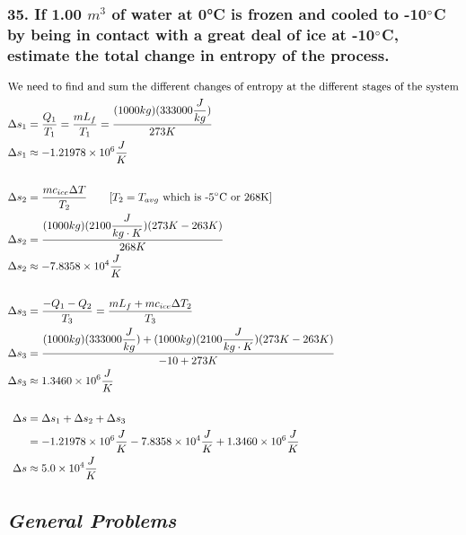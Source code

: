 \documentclass{article}
\begin{document}
\subsubsection*{
    35. If 1.00 $m^3$ of water at 0°C is frozen and cooled to -10$\degree$C 
    by being in contact with a great deal of ice at -10$\degree$C,
    estimate the total change in entropy of the process.
}
\begin{align*}
    \intertext{We need to find and sum the different changes of entropy at the
    different stages of the system}
    \Delta s_1 &= \displaystyle\frac{Q_1}{T_1} = \displaystyle\frac{mL_f}{T_1} =
    \displaystyle\frac{(1000kg)(333000 \displaystyle\frac{J}{kg})}{273K} \\
    \Delta s_1 &\approx -1.21978\times 10^6 \frac{J}{K} \\\\
    \Delta s_2 &= \displaystyle\frac{mc_{ice}\Delta T}{T_2} \qquad [\text{$T_2 =
    T_{avg}$ which is -5$\degree$C or 268K}] \\
    \Delta s_2 &= \displaystyle\frac{(1000kg)(2100
    \displaystyle\frac{J}{kg\cdot K})(273K-263K)}{268K} \\
    \Delta s_2 &\approx -7.8358 \times 10^4 \displaystyle\frac{J}{K}
    \\\\
    \Delta s_3 &= \displaystyle\frac{-Q_1 - Q_2}{T_3} = \displaystyle\frac{mL_f
    + mc_{ice} \Delta T_2}{T_3} \\
    \Delta s_3 &= \displaystyle\frac{(1000kg)(333000
    \displaystyle\frac{J}{kg}) + (1000kg)(2100 \displaystyle\frac{J}{kg\cdot
    K})(273K - 263K)}{-10 + 273K} \\ 
    \Delta s_3 &\approx 1.3460\times 10^6 \displaystyle\frac{J}{K} \\\\
    \Delta s &= \Delta s_1 + \Delta s_2 + \Delta s_3 \\ 
        &= -1.21978\times 10^6 \displaystyle\frac{J}{K} - 7.8358\times 10^4
        \displaystyle\frac{J}{K} + 1.3460\times 10^6
        \displaystyle\frac{J}{K} \\
    \Delta s &\approx 5.0\times 10^4 \displaystyle\frac{J}{K}
\end{align*}
\newpage
\begin{center}
    \subsection*{\textbf{\textit{General Problems}}}
\end{center}
\end{document}
